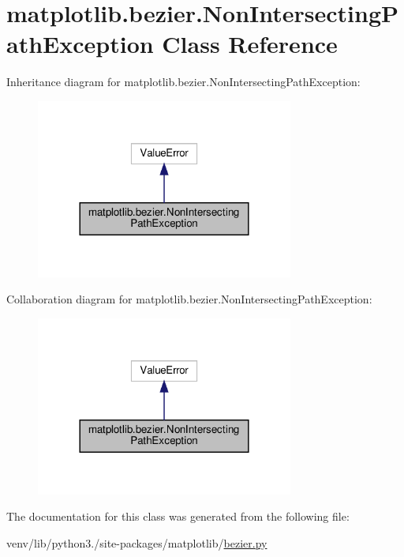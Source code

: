 \hypertarget{classmatplotlib_1_1bezier_1_1NonIntersectingPathException}{}\section{matplotlib.\+bezier.\+Non\+Intersecting\+Path\+Exception Class Reference}
\label{classmatplotlib_1_1bezier_1_1NonIntersectingPathException}


Inheritance diagram for matplotlib.\+bezier.\+Non\+Intersecting\+Path\+Exception\+:
\nopagebreak
\begin{figure}[H]
\begin{center}
\leavevmode
\includegraphics[width=240pt]{classmatplotlib_1_1bezier_1_1NonIntersectingPathException__inherit__graph}
\end{center}
\end{figure}


Collaboration diagram for matplotlib.\+bezier.\+Non\+Intersecting\+Path\+Exception\+:
\nopagebreak
\begin{figure}[H]
\begin{center}
\leavevmode
\includegraphics[width=240pt]{classmatplotlib_1_1bezier_1_1NonIntersectingPathException__coll__graph}
\end{center}
\end{figure}


The documentation for this class was generated from the following file\+:\begin{DoxyCompactItemize}
\item 
venv/lib/python3./site-\/packages/matplotlib/\hyperlink{bezier_8py}{bezier.\+py}\end{DoxyCompactItemize}
